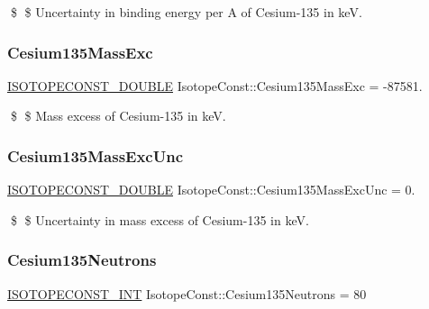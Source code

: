 \$ \$ Uncertainty in binding energy per A of Cesium-\/135 in keV. \mbox{\label{group___isotope_const-_cesium-_cs135_ga57dd2d784c6c3ba70285c4717b03e5d4}} 
\subsubsection{\texorpdfstring{Cesium135\+Mass\+Exc}{Cesium135MassExc}}
{\footnotesize\ttfamily \mbox{\hyperlink{group___isotope_const-_macros_ga8f45a7272ce02c0b4c65c44636ed719a}{I\+S\+O\+T\+O\+P\+E\+C\+O\+N\+S\+T\+\_\+\+D\+O\+U\+B\+LE}} Isotope\+Const\+::\+Cesium135\+Mass\+Exc = -\/87581.}

\$ \$ Mass excess of Cesium-\/135 in keV. \mbox{\label{group___isotope_const-_cesium-_cs135_gae63b743057a56f4584e5c94358682207}} 
\subsubsection{\texorpdfstring{Cesium135\+Mass\+Exc\+Unc}{Cesium135MassExcUnc}}
{\footnotesize\ttfamily \mbox{\hyperlink{group___isotope_const-_macros_ga8f45a7272ce02c0b4c65c44636ed719a}{I\+S\+O\+T\+O\+P\+E\+C\+O\+N\+S\+T\+\_\+\+D\+O\+U\+B\+LE}} Isotope\+Const\+::\+Cesium135\+Mass\+Exc\+Unc = 0.}

\$ \$ Uncertainty in mass excess of Cesium-\/135 in keV. \mbox{\label{group___isotope_const-_cesium-_cs135_ga402e012bdfe3060f4edd015c30383f97}} 
\subsubsection{\texorpdfstring{Cesium135\+Neutrons}{Cesium135Neutrons}}
{\footnotesize\ttfamily \mbox{\hyperlink{group___isotope_const-_macros_ga5f18360b3e99483a35c32d789e62621c}{I\+S\+O\+T\+O\+P\+E\+C\+O\+N\+S\+T\+\_\+\+I\+NT}} Isotope\+Const\+::\+Cesium135\+Neutrons = 80}

